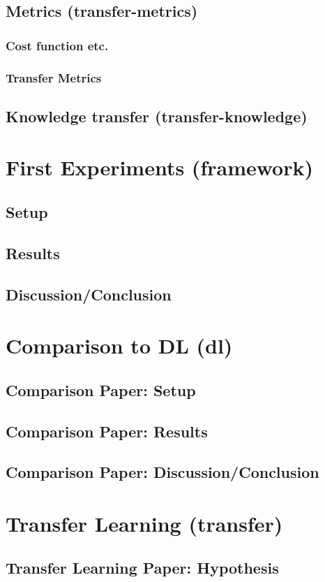 \subsection{Metrics (transfer-metrics)}
\subsubsection{Cost function etc.}
\subsubsection{Transfer Metrics}
\subsection{Knowledge transfer (transfer-knowledge)}
\section{First Experiments (framework)}
\subsection{Setup}
\subsection{Results}
\subsection{Discussion/Conclusion}
\section{Comparison to DL (dl)}
\subsection{Comparison Paper: Setup}
\subsection{Comparison Paper: Results}
\subsection{Comparison Paper: Discussion/Conclusion}
\section{Transfer Learning (transfer)}
\subsection{Transfer Learning Paper: Hypothesis}
